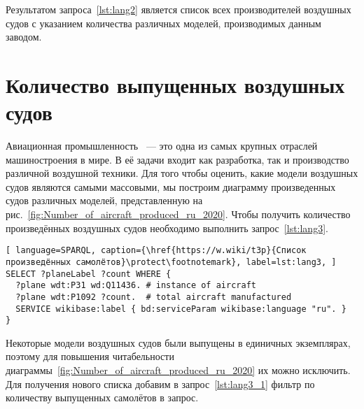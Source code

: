 
Результатом запроса~\ref{lst:lang2} является список всех производителей воздушных судов с указанием количества различных моделей, производимых данным заводом.

\section{Количество выпущенных воздушных судов}

Авиационная промышленность ~--- это одна из самых крупных отраслей машиностроения в мире. 
В её задачи входит как разработка, так и производство различной воздушной техники. 
Для того чтобы оценить, какие модели воздушных судов являются самыми массовыми, 
мы построим диаграмму произведенных судов различных моделей, представленную на рис.~\ref{fig:Number_of_aircraft_produced_ru_2020}. 
Чтобы получить количество произведённых воздушных судов необходимо выполнить запрос~\ref{lst:lang3}.

\begin{lstlisting}[ language=SPARQL, caption={\href{https://w.wiki/t3p}{Список произведённых самолётов}\protect\footnotemark}, label=lst:lang3, ]
SELECT ?planeLabel ?count WHERE {
  ?plane wdt:P31 wd:Q11436. # instance of aircraft
  ?plane wdt:P1092 ?count.  # total aircraft manufactured
  SERVICE wikibase:label { bd:serviceParam wikibase:language "ru". }
}
\end{lstlisting}


Некоторые модели воздушных судов были выпущены в единичных экземплярах, поэтому для повышения читабельности диаграммы~\ref{fig:Number_of_aircraft_produced_ru_2020} их можно исключить. Для получения нового списка добавим в запрос~\ref{lst:lang3_1} фильтр по количеству выпущенных самолётов в запрос.

